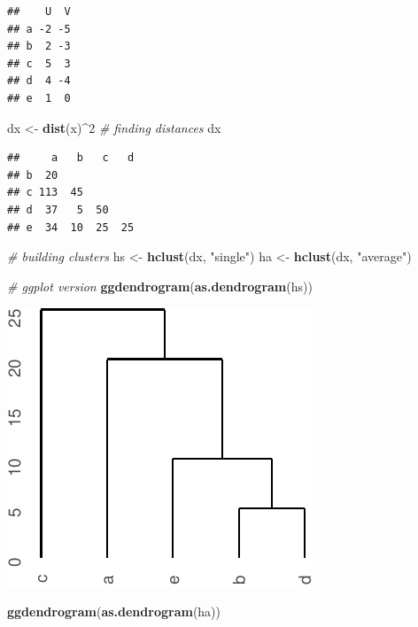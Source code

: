 \documentclass[]{article}
\newenvironment{Shaded}{\begin{snugshade}}{\end{snugshade}}
\newcommand{\CommentTok}[1]{\textcolor[rgb]{0.56,0.35,0.01}{\textit{#1}}}
\newcommand{\DecValTok}[1]{\textcolor[rgb]{0.00,0.00,0.81}{#1}}
\newcommand{\KeywordTok}[1]{\textcolor[rgb]{0.13,0.29,0.53}{\textbf{#1}}}
\newcommand{\NormalTok}[1]{#1}
\newcommand{\OperatorTok}[1]{\textcolor[rgb]{0.81,0.36,0.00}{\textbf{#1}}}
\newcommand{\StringTok}[1]{\textcolor[rgb]{0.31,0.60,0.02}{#1}}
\begin{document}
\begin{verbatim}
##    U  V
## a -2 -5
## b  2 -3
## c  5  3
## d  4 -4
## e  1  0
\end{verbatim}

\begin{Shaded}
\begin{Highlighting}[]
\NormalTok{dx <-}\StringTok{ }\KeywordTok{dist}\NormalTok{(x)}\OperatorTok{^}\DecValTok{2} \CommentTok{# finding distances}
\NormalTok{dx}
\end{Highlighting}
\end{Shaded}

\begin{verbatim}
##     a   b   c   d
## b  20            
## c 113  45        
## d  37   5  50    
## e  34  10  25  25
\end{verbatim}

\begin{Shaded}
\begin{Highlighting}[]
\CommentTok{# building  clusters}
\NormalTok{hs <-}\StringTok{ }\KeywordTok{hclust}\NormalTok{(dx, }\StringTok{"single"}\NormalTok{)}
\NormalTok{ha <-}\StringTok{ }\KeywordTok{hclust}\NormalTok{(dx, }\StringTok{"average"}\NormalTok{)}


\CommentTok{# ggplot version }
\KeywordTok{ggdendrogram}\NormalTok{(}\KeywordTok{as.dendrogram}\NormalTok{(hs))}
\end{Highlighting}
\end{Shaded}

\begin{center}\includegraphics{sol_A1_files/figure-latex/unnamed-chunk-2-1} \end{center}

\begin{Shaded}
\begin{Highlighting}[]
\KeywordTok{ggdendrogram}\NormalTok{(}\KeywordTok{as.dendrogram}\NormalTok{(ha))}
\end{Highlighting}
\end{Shaded}
\end{document}
